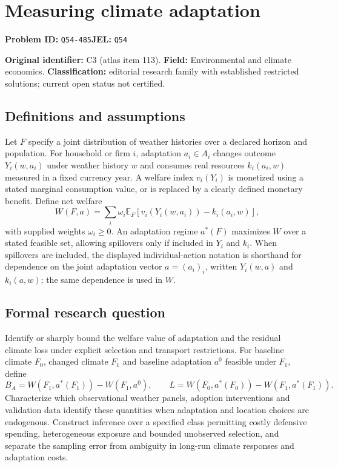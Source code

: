\documentclass[11pt,a4paper]{article}
\begin{document}
\section*{Measuring climate adaptation}
\textbf{Problem ID:} \texttt{Q54-485}\quad \textbf{JEL:} \texttt{Q54}\par
\label{problem:OP-0113}
\label{atlas:prob:C3}

\noindent\textbf{Original identifier:} C3 (atlas item 113). \textbf{Field:} Environmental and climate economics. \textbf{Classification:} editorial research family with established restricted solutions; current open status not certified.

\subsection*{Definitions and assumptions}

Let $F$ specify a joint distribution of weather histories over a declared horizon and population. For household or firm $i$, adaptation $a_i\in A_i$ changes outcome $Y_i(w,a_i)$ under weather history $w$ and consumes real resources $k_i(a_i,w)$ measured in a fixed currency year. A welfare index $v_i(Y_i)$ is monetized using a stated marginal consumption value, or is replaced by a clearly defined monetary benefit. Define net welfare
\[
W(F,a)=\sum_i\omega_i\mathbb E_F[v_i(Y_i(w,a_i))-k_i(a_i,w)],
\]
with supplied weights $\omega_i\ge0$. An adaptation regime $a^*(F)$ maximizes $W$ over a stated feasible set, allowing spillovers only if included in $Y_i$ and $k_i$. When spillovers are included, the displayed individual-action notation is shorthand for dependence on the joint adaptation vector $a=(a_i)_i$, written $Y_i(w,a)$ and $k_i(a,w)$; the same dependence is used in $W$.

\subsection*{Formal research question}

Identify or sharply bound the welfare value of adaptation and the residual climate loss under explicit selection and transport restrictions. For baseline climate $F_0$, changed climate $F_1$ and baseline adaptation $a^0$ feasible under $F_1$, define
\[
B_A=W(F_1,a^*(F_1))-W(F_1,a^0),\qquad
L=W(F_0,a^*(F_0))-W(F_1,a^*(F_1)).
\]
Characterize which observational weather panels, adoption interventions and validation data identify these quantities when adaptation and location choices are endogenous. Construct inference over a specified class permitting costly defensive spending, heterogeneous exposure and bounded unobserved selection, and separate the sampling error from ambiguity in long-run climate responses and adaptation costs.
\end{document}
